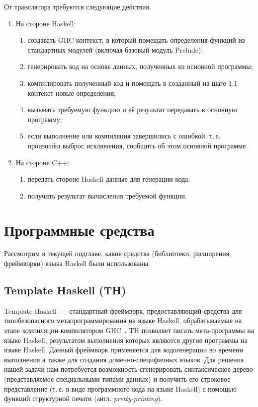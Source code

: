 От транслятора требуются следующие действия.
\begin{enumerate}[1.]
	\item На стороне Haskell:
		\begin{enumerate}[1)]
			\item создавать GHC-контекст, в который помещать определения функций из стандартных модулей (включая базовый модуль Prelude);
			\item генерировать код на основе данных, полученных из основной программы;
			\item компилировать полученный код и помещать в созданный на шаге 1.1 контекст новые определения;
			\item вызывать требуемую функцию и её результат передавать в основную программу;
			\item если выполнение или компиляция завершились с ошибкой, т.\,е. произошёл выброс исключения, сообщить об этом основной программе.
		\end{enumerate}
	\item На стороне C++:
		\begin{enumerate}[1)]
			\item передать стороне Haskell данные для генерации кода;
			\item получить результат вычисления требуемой функции.
		\end{enumerate}
\end{enumerate}
\section{Программные средства}
Рассмотрим в текущей подглаве, какие средства (библиотеки, расширения, фреймворки) языка Haskell были использованы.

	\subsection{Template Haskell (TH)}\label{temphassec} Template Haskell~--- стандартный фреймворк, предоставляющий средства для типобезопасного метапрограммирования на языке Haskell, обрабатываемые на этапе компиляции компилятором GHC~\autocite{temphas}. TH позволяет писать мета-программы на языке Haskell, результатом выполнения которых являются другие программы на языке Haskell. Данный фреймворк применяется для кодогенерации во времени выполнения а также для создания доменно-специфичных языков. Для решения нашей задачи нам потребуется возможность сгенерировать синтаксическое дерево (представляемое специальными типами данных) и получить его строковое представление (т.\,е. в виде программного кода на языке Haskell) с помощью функций структурной печати (англ. \textit{pretty-printing}).
	

